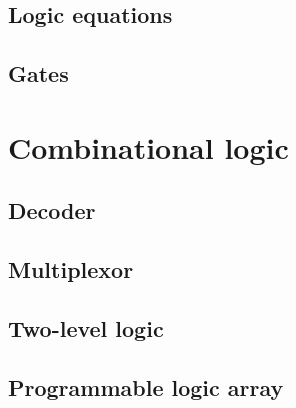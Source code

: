         
    
    
    \subsection{Logic equations}
    
    
    \subsection{Gates}
    
\section{Combinational logic}\label{section:Combinational_logic}
    
    \subsection{Decoder}
    
    \subsection{Multiplexor}
    
    \subsection{Two-level logic}
    
    \subsection{Programmable logic array}
